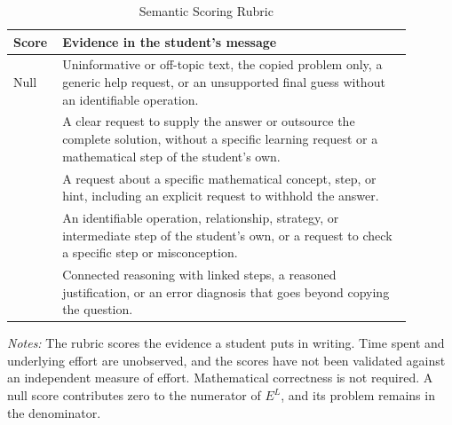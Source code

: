 \begin{table}[htbp]
\centering
\begingroup
{}
\small
\caption{Semantic Scoring Rubric}
\label{tab:llm-rubric}
\begin{tabular}{p{0.08\linewidth}p{0.81\linewidth}}
\toprule
Score & Evidence in the student's message \\
\midrule
Null & Uninformative or off-topic text, the copied problem only, a generic help request, or an unsupported final guess without an identifiable operation. \\
\addlinespace
0 & A clear request to supply the answer or outsource the complete solution, without a specific learning request or a mathematical step of the student's own. \\
\addlinespace
1 & A request about a specific mathematical concept, step, or hint, including an explicit request to withhold the answer. \\
\addlinespace
2 & An identifiable operation, relationship, strategy, or intermediate step of the student's own, or a request to check a specific step or misconception. \\
\addlinespace
3 & Connected reasoning with linked steps, a reasoned justification, or an error diagnosis that goes beyond copying the question. \\
\bottomrule
\end{tabular}
\par\medskip
\begin{minipage}{\linewidth}
\footnotesize
\textit{Notes:} The rubric scores the evidence a student puts in writing. Time spent and underlying effort are unobserved, and the scores have not been validated against an independent measure of effort. Mathematical correctness is not required. A null score contributes zero to the numerator of $E^{L}$, and its problem remains in the denominator.
\end{minipage}
\endgroup
\end{table}
